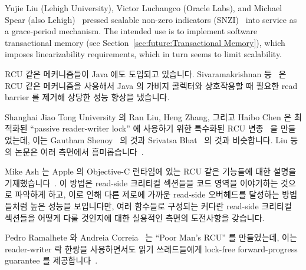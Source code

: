 Yujie Liu (Lehigh University), Victor Luchangco (Oracle Labs), and
Michael Spear (also Lehigh)~\cite{Liu:2013:MSA:2549695.2549732}
pressed scalable non-zero indicators
(SNZI)~\cite{FaithEllen:2007:SNZI} into service as a grace-period
mechanism.
The intended use is to implement software transactional memory
(see Section~\ref{sec:future:Transactional Memory}), which
imposes linearizability requirements, which in turn seems to
limit scalability.
\fi

RCU 같은 메커니즘들이 Java 에도 도입되고 있습니다.
Sivaramakrishnan 등~\cite{Sivaramakrishnan:2012:ERB:2258996.2259005} 은 RCU
같은 메커니즘을 사용해서 Java 의 가비지 콜렉터와 상호작용할 때 필요한 read
barrier 를 제거해 상당한 성능 향상을 냈습니다.

Shanghai Jiao Tong University 의 Ran Liu, Heng Zhang, 그리고 Haibo Chen 은
최적화된 ``passive reader-writer lock'' 에 사용하기 위한 특수화된 RCU
변종~\cite{RanLiu2014PassiveRWLock} 을 만들었는데, 이는 Gautham
Shenoy~\cite{GauthamShenoy2006RCUrwlock} 의 것과 Srivatsa
Bhat~\cite{SrivatsaSBhat2014RCUrwlock} 의 것과 비슷합니다.
Liu 등의 논문은 여러 측면에서 흥미롭습니다~\cite{PaulEMcKenney2014ReadMostly}.
\iffalse

RCU-like mechanisms are also finding their way into Java.
Sivaramakrishnan et al.~\cite{Sivaramakrishnan:2012:ERB:2258996.2259005}
use an RCU-like mechanism to eliminate the read barriers that are
otherwise required when interacting with Java's garbage collector,
resulting in significant performance improvements.

Ran Liu, Heng Zhang, and Haibo Chen of Shanghai Jiao Tong University
created a specialized variant of RCU that they used for an optimized
``passive reader-writer lock''~\cite{RanLiu2014PassiveRWLock}, similar to
those created by Gautham Shenoy~\cite{GauthamShenoy2006RCUrwlock} and
Srivatsa Bhat~\cite{SrivatsaSBhat2014RCUrwlock}.
The Liu et al.~paper is interesting from a number of
perspectives~\cite{PaulEMcKenney2014ReadMostly}.
\fi

Mike Ash 는 Apple 의 Objective-C 런타임에 있는 RCU 같은 기능들에 대한 설명을
기재했습니다~\cite{MikeAsh2015Apple}.
이 방법은 read-side 크리티컬 섹션들을 코드 영역을 이야기하는 것으로 파악하게
하고, 이로 인해 다른 제로에 가까운 read-side 오버헤드를 달성하는 방법들처럼
높은 성능을 보입니다만, 여러 함수들로 구성되는 커다란 read-side 크리티컬
섹션들을 어떻게 다룰 것인지에 대한 실용적인 측면의 도전사항을 갖습니다.

Pedro Ramalhete 와 Andreia Correia~\cite{PedroRmalhete2015PoorMansRCU} 는
``Poor Man's RCU'' 를 만들었는데, 이는 reader-writer 락 한쌍을 사용하면서도
읽기 쓰레드들에게 lock-free forward-progress guarantee 를
제공합니다~\cite{PaulEMcKenney2015ReadMostly}.


